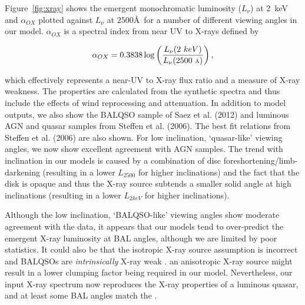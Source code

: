 \documentclass[useAMS,usenatbib]{mn2e_x}
\begin{document}
\begin{figure}
\end{figure}



Figure~\ref{fig:xray} shows the emergent
monochromatic luminosity ($L_\nu$) at 2~keV and $\alpha_{OX}$ plotted against 
$L_\nu$ at $2500$\AA\ for a number of different viewing angles in our model.
$\alpha_{OX}$ is a spectral index from near UV to X-rays defined by

\begin{equation}
\alpha_{OX}=0.3838\log\left(\frac{L_{\nu}(2~keV)}{L_{\nu}(2500~\mbox{\scriptsize{\AA}})}\right),
\end{equation}

which effectively represents a near-UV to X-ray flux ratio and a measure of X-ray 
weakness. The properties are calculated from the synthetic spectra and thus include
the effects of wind reprocessing and attenuation. In addition to model outputs,
we also show the BALQSO sample of Saez et al. (2012) and luminous AGN and quasar
samples from Steffen et al. (2006). The best fit relations from Steffen et al. (2006)
are also shown.
For low inclination, `quasar-like' viewing angles,
we now show excellent agreement with AGN samples. The trend with inclination
in our models is caused by a combination of disc foreshortening/limb-darkening 
(resulting in a lower $L_{2500}$ for higher inclinations) and the fact that the disk 
is opaque and thus the X-ray source subtends a smaller solid angle at high inclinations
(resulting in a lower $L_{2keV}$ for higher inclinations). 

Although the low inclination, `BALQSO-like' viewing angles show moderate agreement with the data,
it appears that our models tend to over-predict the emergent X-ray luminosity at BAL angles, 
although we are limited by poor statistics. 
It could also be that the isotropic X-ray source assumption 
is incorrect and BALQSOs are {\em intrinsically} 
X-ray weak \citep[e.g.][]{morabito2013}. 
an anisotropic X-ray source might result in a lower clumping factor being
required in our model.
Nevertheless, our input X-ray spectrum
now reproduces the X-ray properties of a luminous quasar,
and at least some BAL angles match the .
\end{document}
